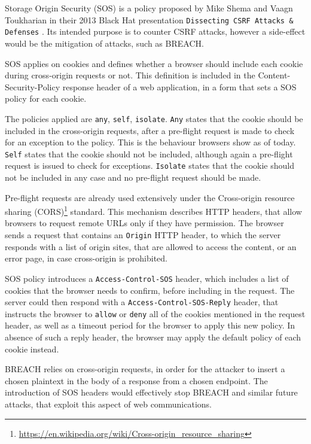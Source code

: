 Storage Origin Security (SOS) is a policy proposed by Mike Shema and Vaagn
Toukharian in their 2013 Black Hat presentation \texttt{Dissecting CSRF Attacks
\& Defenses} \cite{sos}. Its intended purpose is to counter CSRF attacks,
however a side-effect would be the mitigation of attacks, such as BREACH.

SOS applies on cookies and defines whether a browser should include each cookie
during cross-origin requests or not. This definition is included in the
Content-Security-Policy response header of a web application, in a form that
sets a SOS policy for each cookie.

The policies applied are \texttt{any}, \texttt{self}, \texttt{isolate}.
\texttt{Any} states that the cookie should be included in the cross-origin
requests,  after a pre-flight request is made to check for an exception to the
policy. This is the behaviour browsers show as of today. \texttt{Self} states
that the cookie should not be included, although again a pre-flight request is
issued to check for exceptions. \texttt{Isolate} states that the cookie should
not be included in any case and no pre-flight request should be made.

Pre-flight requests are already used extensively under the Cross-origin resource
sharing
(CORS)\footnote{\url{https://en.wikipedia.org/wiki/Cross-origin_resource_sharing}}
standard.  This mechanism describes HTTP headers, that allow browsers to request
remote URLs only if they have permission. The browser sends a request that
contains an \texttt{Origin} HTTP header, to which the server responds with a
list of origin sites, that are allowed to access the content, or an error page,
in case cross-origin is prohibited.

SOS policy introduces a \texttt{Access-Control-SOS} header, which includes a
list of cookies that the browser needs to confirm, before including in the
request. The server could then respond with a \texttt{Access-Control-SOS-Reply}
header, that instructs the browser to \texttt{allow} or \texttt{deny} all of the
cookies mentioned in the request header, as well as a timeout period for the
browser to apply this new policy. In absence of such a reply header, the browser
may apply the default policy of each cookie instead.

BREACH relies on cross-origin requests, in order for the attacker to insert a
chosen plaintext in the body of a response from a chosen endpoint. The
introduction of SOS headers would effectively stop BREACH and similar future
attacks, that exploit this aspect of web communications.

